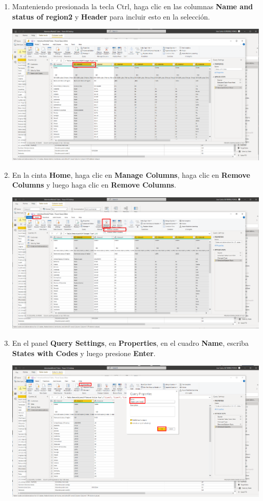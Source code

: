 \documentclass[12pt,letterpaper]{article}
\newcommand\tab[1][1cm]{\hspace*{#1}}
\begin{document}
\begin{enumerate}[\tab 1.]
\begin{center}
        \end{center}
        \item Manteniendo presionada la tecla Ctrl, haga clic en las columnas \textbf{Name and status of region2} y \textbf{Header} para incluir esto en la selección.
        \begin{center}
            \includegraphics[width=13cm]{./img/img62.png}
        \end{center}
        \item En la cinta \textbf{Home}, haga clic en \textbf{Manage Columns}, haga clic en \textbf{Remove Columns} y luego haga clic en \textbf{Remove Columns}.
        \begin{center}
            \includegraphics[width=13cm]{./img/img63.png}
        \end{center}
        \item En el panel \textbf{Query Settings}, en \textbf{Properties}, en el cuadro \textbf{Name}, escriba \textbf{States with Codes} y luego presione \textbf{Enter}.
        \begin{center}
            \includegraphics[width=13cm]{./img/img64.png}

\end{center}
\end{enumerate}
\end{document}
